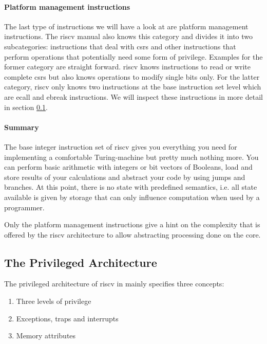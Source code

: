 \paragraph{Platform management instructions}
The last type of instructions we will have a look at are platform management instructions.
The \gls{riscv} manual also knows this category and divides it into two subcategories: instructions that deal with \glspl{csr} and other instructions that perform operations that potentially need some form of privilege.
Examples for the former category are straight forward.
\gls{riscv} knows instructions to read or write complete \glspl{csr} but also knows operations to modify single bits only.
For the latter category, \gls{riscv} only knows two instructions at the base instruction set level which are \gls{ecall} and \gls{ebreak} instructions.
We will inspect these instructions in more detail in section \ref{sec:rv-priv-arch}.

\paragraph{Summary}
The base integer instruction set of \gls{riscv} gives you everything you need for implementing a comfortable Turing-machine but pretty much nothing more.
You can perform basic arithmetic with integers or bit vectors of Booleans, load and store results of your calculations and abstract your code by using jumps and branches.
At this point, there is no state with predefined semantics, i.e. all state available is given by storage that can only influence computation when used by a programmer.

Only the platform management instructions give a hint on the complexity that is offered by the \gls{riscv} architecture to allow abstracting processing done on the core.

\subsection{The Privileged Architecture}
\label{sec:rv-priv-arch}

The privileged architecture of \gls{riscv} in \cite{RiscVISAP} mainly specifies three concepts:
\begin{enumerate}
    \item Three levels of privilege
    \item Exceptions, traps and interrupts
    \item Memory attributes
\end{enumerate}

